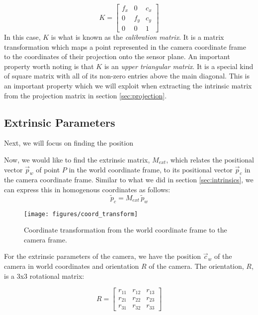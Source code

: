 \begin{equation}
    K =
    \begin{bmatrix}
        f_x & 0   & c_x \\
        0   & f_y & c_y \\
        0   & 0   & 1
    \end{bmatrix}
\end{equation}
In this case, $K$ is what is known as the \emph{calibration matrix}. It is a matrix transformation which maps a point represented in the camera coordinate frame to the coordinates of their projection onto the sensor plane. An important property worth noting is that $K$ is an \emph{upper triangular matrix}. It is a special kind of square matrix with all of its non-zero entries above the main diagonal. This is an important property which we will exploit when extracting the intrinsic matrix from the projection matrix in section \ref{sec:projection}.

\subsection{Extrinsic Parameters} \label{sec:extrinsics}

Next, we will focus on finding the position

Now, we would like to find the extrinsic matrix, $M_{ext}$, which relates the positional vector $\vec{p}_w$ of point $P$ in the world coordinate frame, to its positional vector $\vec{p}_c$ in the camera coordinate frame. Similar to what we did in section \ref{sec:intrinsics}, we can express this in homogenous coordinates as follows:
\begin{equation} \label{eq:pc}
    \widetilde{p}_c =  M_{ext}\,\widetilde{p}_w
\end{equation}

\begin{figure}[H]
    \centering
    \texttt{[image: figures/coord\_transform]}
    \caption{Coordinate transformation from the world coordinate frame to the camera frame.}
\end{figure}


For the extrinsic parameters of the camera, we have the position $\vec{c}_w$ of the camera in world coordinates and orientation $R$ of the camera. The orientation, $R$, is a 3x3 rotational matrix:

\begin{equation}
    R =
    \begin{bmatrix}
        r_{11} & r_{12} & r_{13} \\
        r_{21} & r_{22} & r_{23} \\
        r_{31} & r_{32} & r_{33}
    \end{bmatrix}
\end{equation}

